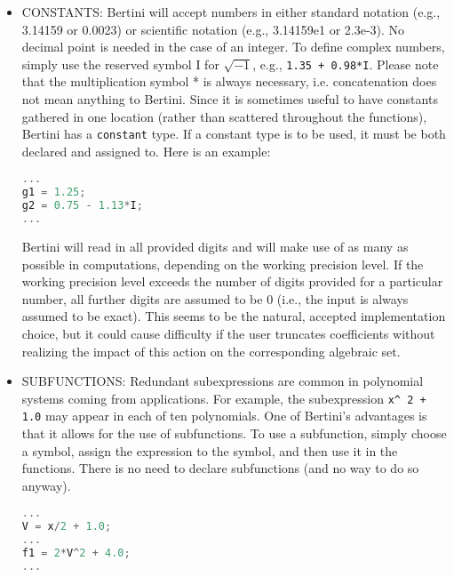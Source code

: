 \begin{itemize}
\item{CONSTANTS:}
Bertini will accept numbers in either standard notation (e.g., 3.14159 or 0.0023) or scientific notation (e.g., 3.14159e1 or 2.3e-3). No decimal point is needed in the case of an integer. To define complex numbers, simply use the reserved symbol I for $\sqrt{-1}$, e.g., \texttt{1.35 + 0.98*I}. Please note that the multiplication symbol * is always necessary, i.e. concatenation does not
 mean anything to Bertini. Since it is sometimes useful to have constants gathered in one location (rather than scattered
 throughout the functions), Bertini has a \texttt{constant} type. If a constant type is to be used, it must be both declared and assigned to. Here is an example:
\begin{center}\begin{minipage}{0.9\linewidth}

\begin{lstlisting}[language=c++, caption=Adapted from \cite{BM13}, captionpos=b]
...
g1 = 1.25;
g2 = 0.75 - 1.13*I;
...
\end{lstlisting}
\end{minipage}\end{center}

Bertini will read in all provided digits and will make use of as many as possible in computations, depending on the working precision level. If the working precision level exceeds the number of digits provided for a particular number, all further digits are assumed to be
 0 (i.e., the input is always assumed to be exact). This seems to be the natural, accepted implementation choice, but it could cause difficulty if the user truncates coefficients without realizing the impact of this action on the corresponding algebraic set.

\item{SUBFUNCTIONS:}
Redundant subexpressions are common in polynomial systems coming from applications. For example, the subexpression \texttt{x\string^ 2 + 1.0} may appear in each of ten polynomials. One of Bertini’s advantages is that it allows for the use of subfunctions. To use a subfunction, simply choose a symbol, assign the expression to the symbol, and then use it in the functions. There is no need to declare subfunctions (and no way to do so anyway).

\begin{center}\begin{minipage}{0.9\linewidth}
\begin{lstlisting}[language=c++, caption=Adapted from \cite{BM13}, captionpos=b]
...
V = x/2 + 1.0;
...
f1 = 2*V^2 + 4.0;
...
\end{lstlisting}
\end{minipage}\end{center}


\end{itemize}
